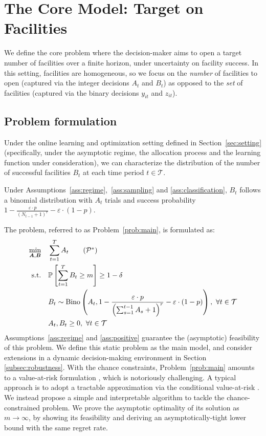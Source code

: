 \documentclass[nonblindrev]{informs3noheader}
\DeclareMathOperator\Bino{Bino}
\def\P{\mathbb{P}}
\def\calP{\mathcal{P}}
\def\calT{\mathcal{T}}
\def\bA{\boldsymbol{A}}
\def\bB{\boldsymbol{B}}
\def\st{\text{s.t.}}
\begin{document}
\section{The Core Model: Target on Facilities}
\label{sec:base}

We define the core problem where the decision-maker aims to open a target number of facilities over a finite horizon, under uncertainty on facility success. In this setting, facilities are homogeneous, so we focus on the \textit{number} of facilities to open (captured via the integer decisions $A_t$ and $B_t$) as opposed to the \textit{set} of facilities (captured via the binary decisions $y_{it}$ and $z_{it}$). 

\subsection{Problem formulation}

Under the online learning and optimization setting defined in Section~\ref{sec:setting} (specifically, under the asymptotic regime, the allocation process and the learning function under consideration), we can characterize the distribution of the number of successful facilities $B_t$ at each time period $t\in\calT$.
\begin{corollary}\label{cor:success}
    Under Assumptions~\ref{ass:regime},~\ref{ass:sampling} and \ref{ass:classification}, $B_t$ follows a binomial distribution with $A_t$ trials and success probability $1- \frac{\varepsilon\cdot p}{\left(N_{t-1} + 1\right)^r}-\varepsilon\cdot(1-p)$. 
\end{corollary}

The problem, referred to as Problem~\eqref{prob:main}, is formulated as:
\begin{align}
    \min_{\bA,\bB}\quad & \sum_{t=1}^T A_t \label{prob:main}\tag{$\calP^*$}\\
    \st\quad&\P\left[\sum_{t=1}^TB_t\geq m\right] \geq 1-\delta \nonumber\\
    \quad& B_t\sim \Bino\left(A_t, 1- \frac{\varepsilon\cdot p}{\left(\sum_{s=1}^{t-1} A_s +1\right)^r}-\varepsilon\cdot(1-p)\right),\ \forall t\in\calT\nonumber\\
    \quad& A_t,B_t\geq0,\ \forall t\in\calT\nonumber
\end{align}
Assumptions~\ref{ass:regime} and \ref{ass:positive} guarantee the (asymptotic) feasibility of this problem. We define this static problem as the main model, and consider extensions in a dynamic decision-making environment in Section \ref{subsec:robustness}. With the chance constraints, Problem~\eqref{prob:main} amounts to a value-at-risk formulation \citep{uryasev2010var}, which is notoriously challenging. A typical approach is to adopt a tractable approximation via the conditional value-at-risk \citep{uryasev2001conditional,chenreddy2024end,wang2024learning}. We instead propose a simple and interpretable algorithm to tackle the chance-constrained problem. We prove the asymptotic optimality of its solution as $m\to\infty$, by showing its feasibility and deriving an asymptotically-tight lower bound with the same regret rate.
\end{document}
